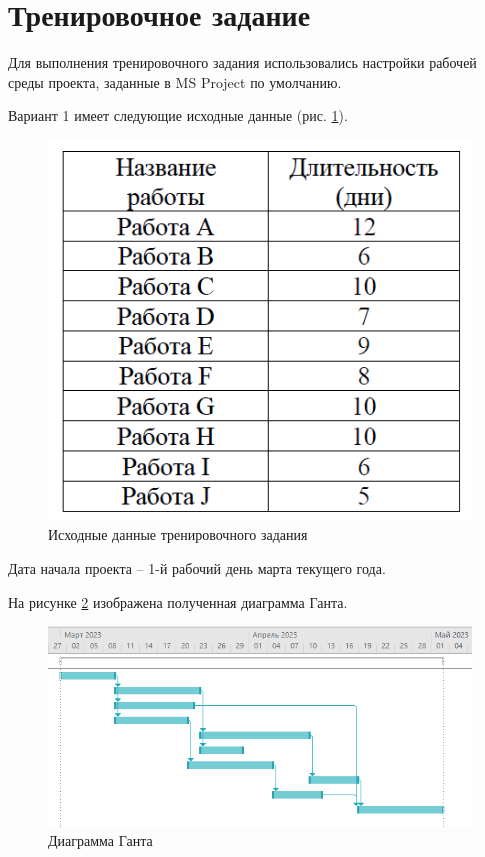\section*{Тренировочное задание}

Для выполнения тренировочного задания использовались настройки рабочей среды проекта, заданные в MS Project по умолчанию.

Вариант 1 имеет следующие исходные данные (рис. \ref{p1}).
\begin{figure}[!h]
	\centering
	\includegraphics[width=0.5\linewidth]{inc/img/1.png}
	\caption{Исходные данные тренировочного задания}
	\label{p1}
\end{figure}

Дата начала проекта – 1-й рабочий день марта текущего года.

На рисунке \ref{p2} изображена полученная диаграмма Ганта.
\begin{figure}[!h]
	\includegraphics[width=1\linewidth]{inc/img/2.png}
	\caption{Диаграмма Ганта}
	\label{p2}
\end{figure}

